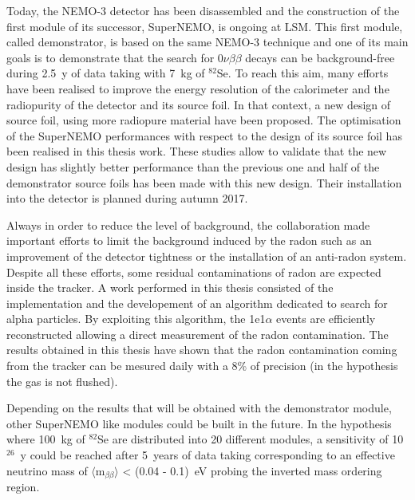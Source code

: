 \documentclass[main.tex]{subfiles}
\begin{document}
\NI Today, the NEMO-3 detector has been disassembled and the construction of the first module of its successor, SuperNEMO, is ongoing at LSM. This first module, called demonstrator, is based on the same NEMO-3 technique and one of its main goals is to demonstrate that the search for 0$\nu\beta\beta$ decays can be background-free during 2.5~y of data taking with 7~kg of $^{\text{82}}$Se. To reach this aim, many efforts have been realised to improve the energy resolution of the calorimeter and the radiopurity of the detector and its source foil. In that context, a new design of source foil, using more radiopure material have been proposed. The optimisation of the SuperNEMO performances with respect to the design of its source foil has been realised in this thesis work. These studies allow to validate that the new design has slightly better performance than the previous one and half of the demonstrator source foils has been made with this new design. Their installation into the detector is planned during autumn 2017.


\bigskip


\NI Always in order to reduce the level of background, the collaboration made important efforts to limit the background induced by the radon such as an improvement of the detector tightness or the installation of an anti-radon system. Despite all these efforts, some residual contaminations of radon are expected inside the tracker. A work performed in this thesis consisted of the implementation and the developement of an algorithm dedicated to search for alpha particles. By exploiting this algorithm, the 1e1$\alpha$ events are efficiently reconstructed allowing a direct measurement of the radon contamination. The results obtained in this thesis have shown that the radon contamination coming from the tracker can be mesured daily with a 8\% of precision (in the hypothesis the gas is not flushed). 


\bigskip


\NI Depending on the results that will be obtained with the demonstrator module, other SuperNEMO like modules could be built in the future. In the hypothesis where 100~kg of $^{\text{82}}$Se are distributed into 20 different modules, a sensitivity of 10$^{\text{26}}$~y could be reached after 5~years of data taking corresponding to an effective neutrino mass of $\langle \text{m}_{\beta\beta} \rangle$ < (0.04 - 0.1)~eV probing the inverted mass ordering region.
\end{document}
